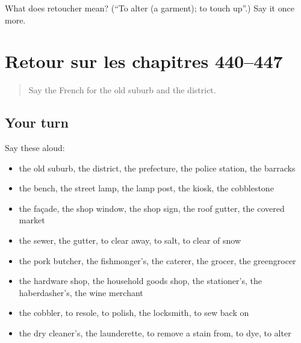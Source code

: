 \begin{tcolorbox}[breakable,colback=teal!4,colframe=teal!35!black,title={Before you move on}]
What does retoucher mean? (\textquotedblleft{}To alter (a garment); to touch up\textquotedblright{}.) Say it once more.
\end{tcolorbox}
\section[(dialogue)]{Retour sur les chapitres 440–447}

\label{lesson:FR-R447-revision-440-447}



\begin{quote}
Say the French for the old suburb and the district.
\end{quote}

\subsection*{Your turn}
Say these aloud:

\begin{itemize}
\raggedright
  \item the old suburb, the district, the prefecture, the police station, the barracks
  \item the bench, the street lamp, the lamp post, the kiosk, the cobblestone
  \item the façade, the shop window, the shop sign, the roof gutter, the covered market
  \item the sewer, the gutter, to clear away, to salt, to clear of snow
  \item the pork butcher, the fishmonger’s, the caterer, the grocer, the greengrocer
  \item the hardware shop, the household goods shop, the stationer’s, the haberdasher’s, the wine merchant
  \item the cobbler, to resole, to polish, the locksmith, to sew back on
  \item the dry cleaner’s, the launderette, to remove a stain from, to dye, to alter
\end{itemize}

